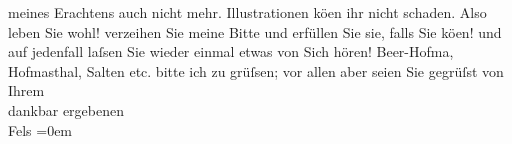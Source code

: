 \begin{ledgroupsized}[t]{13cm}
               meines Erachtens auch nicht mehr. Illustrationen kö{\geminationn}en
               ihr nicht schaden.\pend
           \pstart
           Also leben Sie wohl! verzeihen Sie meine Bitte und erfüllen Sie sie, falls Sie kö{\geminationn}en! und auf jedenfall laſsen Sie wieder einmal etwas
               von Sich hören! Beer-Hofma{\geminationn}, Hofma{\geminationn}sthal, Salten etc. bitte ich zu
               grüſsen; vor allen aber seien Sie gegrüſst \pend
           \pstart
           von{\\[\baselineskip]}Ihrem{\\[\baselineskip]}dankbar ergebenen{\\[\baselineskip]}\spacefill\mbox{Fels}\pend
           \leftskip=0em{}
         
         \endnumbering{}\end{ledgroupsized}  \newcommand{\dateiname}{L00488}\newcommand{\titel}{Friedrich M. Fels an Arthur Schnitzler, 19. 9. 1895}\newcommand{\editorInnen}{Martin Anton Müller und Gerd-Hermann Susen}
      